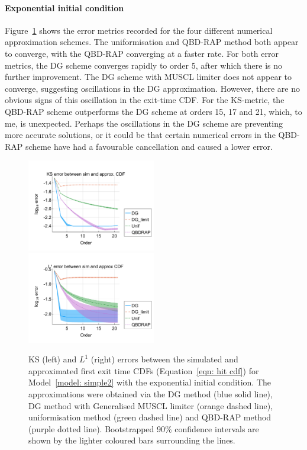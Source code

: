\paragraph{Exponential initial condition}
Figure~\ref{fig: hitting time exp} shows the error metrics recorded for the four different numerical approximation schemes. The uniformisation and QBD-RAP method both appear to converge, with the QBD-RAP converging at a faster rate. For both error metrics, the DG scheme converges rapidly to order 5, after which there is no further improvement. The DG scheme with MUSCL limiter does not appear to converge, suggesting oscillations in the DG approximation. However, there are no obvious signs of this oscillation in the exit-time CDF. For the KS-metric, the QBD-RAP scheme outperforms the DG scheme at orders 15, 17 and 21, which, to me, is unexpected. Perhaps the oscillations in the DG scheme are preventing more accurate solutions, or it could be that certain numerical errors in the QBD-RAP scheme have had a favourable cancellation and caused a lower error.
\begin{figure}
	\centering
	\includegraphics[width=0.5\textwidth,trim={0.75cm 0.8cm 0.25cm 1.25cm},clip]{chapter6/figs/hitting_times_model/hitting_times/exp/ks_error_formatted.pdf}%
	\includegraphics[width=0.5\textwidth,trim={0.75cm 0.8cm 0.25cm 1.25cm},clip]{chapter6/figs/hitting_times_model/hitting_times/exp/l1_cdf_error_formatted.pdf}
	\caption{KS (left) and \(L^1\) (right) errors between the simulated and approximated first exit time CDFs (Equation~\ref{eqn: hit cdf}) for Model~\ref{model: simple2} with the exponential initial condition. The approximations were obtained via the DG method (blue solid line), DG method with Generalised MUSCL limiter (orange dashed line), uniformisation method (green dashed line) and QBD-RAP method (purple dotted line). Bootstrapped 90\% confidence intervals are shown by the lighter coloured bars surrounding the lines.} 
	\label{fig: hitting time exp} 
\end{figure}

